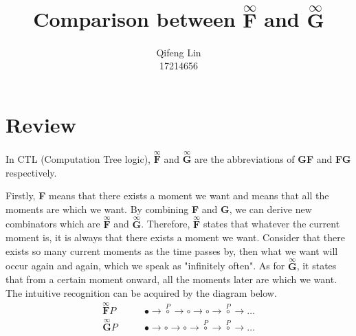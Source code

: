 \documentclass{acmtog} %
\begin{document}

\title{Comparison between $\overset{\infty}{\textbf{F}}$ and $\overset{\infty}{\textbf{G}}$} %

\author{Qifeng Lin \\ 17214656}


\maketitle


\section{Review}
    In CTL (Computation Tree logic), $\overset{\infty}{\textbf{F}}$ and $\overset{\infty}{\textbf{G}}$ are the abbreviations of \textbf{GF} and \textbf{FG} respectively.

    Firstly, \textbf{F} means that there exists a moment we want and  means that all the moments are which we want. By combining \textbf{F} and \textbf{G}, we can derive new combinators which are $\overset{\infty}{\textbf{F}}$ and $\overset{\infty}{\textbf{G}}$. Therefore, $\overset{\infty}{\textbf{F}}$ states that whatever the current moment is, it is always that there exists a moment we want. Consider that there exists so many current moments as the time passes by, then what we want will occur again and again, which we speak as "infinitely often". As for $\overset{\infty}{\textbf{G}}$, it states that from a certain moment onward, all the moments later are which we want. The intuitive recognition can be acquired by the diagram below.
    \begin{equation*}
      \begin{aligned}
       \overset{\infty}{\textbf{F}}P\qquad & \bullet\rightarrow\overset{P}{\circ}\rightarrow\circ\rightarrow\circ\rightarrow\overset{P}{\circ}\rightarrow\dots \\
       \overset{\infty}{\textbf{G}}P\qquad & \bullet\rightarrow\circ\rightarrow\circ\rightarrow\overset{P}{\circ}\rightarrow\overset{P}{\circ}\rightarrow\dots
      \end{aligned}
    \end{equation*}
    
\end{document}

